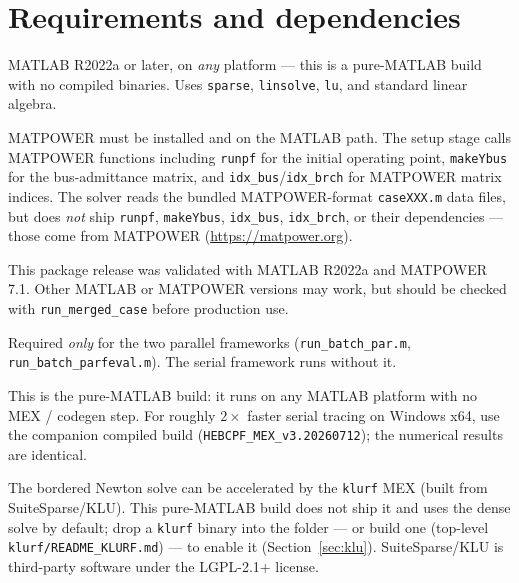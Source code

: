 \documentclass[11pt,a4paper]{article}
\newcommand{\code}[1]{\texttt{#1}}
\begin{document}
\section{Requirements and dependencies}

\begin{description}[leftmargin=0em,style=nextline]
\item[MATLAB (required).] MATLAB R2022a or later, on \emph{any} platform --- this is a
      pure-MATLAB build with no compiled binaries. Uses \code{sparse}, \code{linsolve},
      \code{lu}, and standard linear algebra.
\item[MATPOWER (required).] MATPOWER must be installed and on the MATLAB path. The setup
      stage calls MATPOWER functions including \code{runpf} for the initial operating
      point, \code{makeYbus} for the bus-admittance matrix, and
      \code{idx_bus}/\code{idx_brch} for MATPOWER matrix indices. The solver reads the
      bundled MATPOWER-format \code{caseXXX.m} data files, but does \emph{not} ship
      \code{runpf}, \code{makeYbus}, \code{idx_bus}, \code{idx_brch}, or their
      dependencies --- those come from MATPOWER (\url{https://matpower.org}).
\item[Validated setup.] This package release was validated with MATLAB R2022a and
      MATPOWER 7.1. Other MATLAB or MATPOWER versions may work, but should be checked with
      \code{run_merged_case} before production use.
\item[Parallel Computing Toolbox (optional).] Required \emph{only} for the two parallel
      frameworks (\code{run_batch_par.m}, \code{run_batch_parfeval.m}). The serial
      framework runs without it.
\item[No compiler needed.] This is the pure-MATLAB build: it runs on any MATLAB platform
      with no MEX / codegen step. For roughly $2\times$ faster serial tracing on Windows
      x64, use the companion compiled build (\code{HEBCPF_MEX_v3.20260712}); the numerical
      results are identical.
\item[KLU acceleration (optional).] The bordered Newton solve can be accelerated by the
      \code{klurf} MEX (built from SuiteSparse/KLU). This pure-MATLAB build does not ship it
      and uses the dense solve by default; drop a \code{klurf} binary into the folder --- or
      build one (top-level \code{klurf/README_KLURF.md}) --- to enable it
      (Section~\ref{sec:klu}). SuiteSparse/KLU is third-party software under the LGPL-2.1+
      license.
\end{description}
\end{document}
